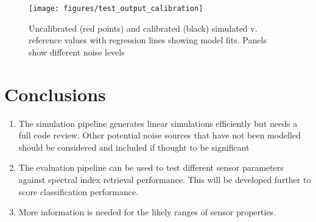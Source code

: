 \documentclass[10pt,a4paper,final,twocolumn]{article}
\begin{document}
\begin{figure*}
\texttt{[image: figures/test\_output\_calibration]}
\caption{Uncalibrated (red points) and calibrated (black) simulated v. reference values with regression lines showing model fits. Panels show different noise levels}
\label{fig:cal}
\end{figure*}

\section{Conclusions}
\begin{enumerate}
\item The simulation pipeline generates linear simulations efficiently but needs a full code review. Other potential noise sources that have not been modelled should be considered and included if thought to be significant
\item The evaluation pipeline can be used to test different sensor parameters against spectral index retrieval performance. This will be developed further to score classification performance.
\item More information is needed for the likely ranges of sensor properties.
\end{enumerate}
\end{document}
